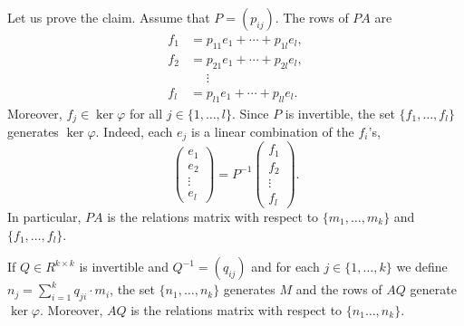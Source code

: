Let us prove the claim. Assume that $P=(p_{ij})$. The rows of $PA$ are 
\begin{align*}
f_1 &= p_{11}e_1+\cdots+p_{1l}e_l,\\
f_2 &= p_{21}e_1+\cdots+p_{2l}e_l,\\
&\phantom{=}\vdots\\
f_l &= p_{l1}e_1+\cdots+p_{ll}e_l.	
\end{align*}
Moreover, $f_j\in\ker\varphi$ for all $j\in\{1,\dots,l\}$. 
Since $P$ is invertible, the set $\{f_1,\dots,f_l\}$ generates $\ker\varphi$. Indeed, each 
$e_j$ is a linear combination of the $f_i$'s,  
\[
\begin{pmatrix}
e_1\\
e_2\\
\vdots\\
e_l	
\end{pmatrix}
=P^{-1}\begin{pmatrix}
f_1\\
f_2\\
\vdots\\
f_l
\end{pmatrix}.
\]
In particular, $PA$ is the relations matrix with respect to 
$\{m_1,\dots,m_k\}$ and $\{f_1,\dots,f_l\}$.  

\begin{claim}
	If $Q\in R^{k\times k}$ is invertible and $Q^{-1}=(q_{ij})$ and for each
	$j\in\{1,\dots,k\}$ we define $n_j=\sum_{i=1}^k q_{ji}\cdot m_i$, the set
	$\{n_1,\dots,n_k\}$ generates $M$ and the rows of $AQ$ generate
	$\ker\varphi$. Moreover, $AQ$ is the relations matrix with respect to
	$\{n_1\dots,n_k\}$.  
\end{claim}

